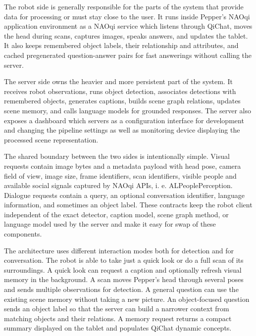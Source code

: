 The robot side is generally responsible for the parts of the system that provide data for processing or must stay close to the user.
It runs inside Pepper's NAOqi application environment as a NAOqi service which listens through QiChat, moves the head during scans, captures images, speaks answers, and updates the tablet. It also keeps remembered object labels, their relationship and attributes, and cached pregenerated question-answer pairs for fast answerings without calling the server.

The server side owns the heavier and more persistent part of the system.
It receives robot observations, runs object detection, associates detections with remembered objects, generates captions, builds scene graph relations, updates scene memory, and calls language models for grounded responses.
The server also exposes a dashboard which servers as a configuration interface for development and changing the pipeline settings as well as monitoring device displaying the processed scene representation. %

The shared boundary between the two sides is intentionally simple. Visual requests contain image bytes and a metadata payload with head pose, camera field of view, image size, frame identifiers, scan identifiers, visible people and available social signals captured by NAOqi APIs, i. e. ALPeoplePerception.
Dialogue requests contain a query, an optional conversation identifier, language information, and sometimes an object label. These contracts keep the robot client independent of the exact detector, caption model, scene graph method, or language model used by the server and make it easy for swap of these components.

The architecture uses different interaction modes both for detection and for conversation. The robot is able to take just a quick look or do a full scan of its surroundings. A quick look can request a caption and optionally refresh visual memory in the background. A scan moves Pepper's head through several poses and sends multiple observations for detection. A general question can use the existing scene memory without taking a new picture. An object-focused question sends an object label so that the server can build a narrower context from matching objects and their relations. A memory request returns a compact summary displayed on the tablet and populates QiChat dynamic concepts.

